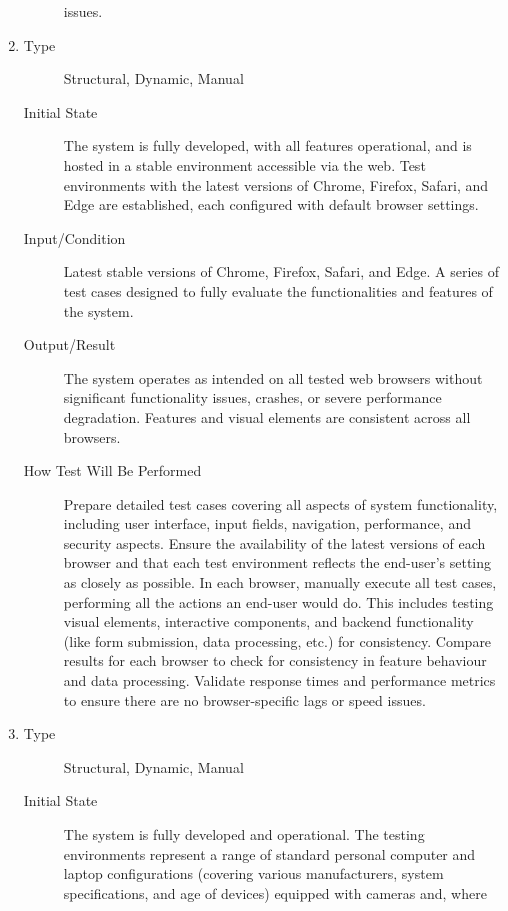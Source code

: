 \documentclass[12pt, titlepage]{article}
\begin{document}
\begin{enumerate}[NFR-T1]
\begin{description}
    issues.
  \end{description}
\item \label{NFRT17}
  \begin{description}
  \item[Type] Structural, Dynamic, Manual
  \item[Initial State] The system is fully developed, with all features
    operational, and is hosted in a stable environment accessible via the web.
    Test environments with the latest versions of Chrome, Firefox, Safari, and
    Edge are established, each configured with default browser settings.
  \item[Input/Condition] Latest stable versions of Chrome, Firefox, Safari, and
    Edge. A series of test cases designed to fully evaluate the functionalities
    and features of the system.
  \item[Output/Result] The system operates as intended on all tested web
    browsers without significant functionality issues, crashes, or severe
    performance degradation. Features and visual elements are consistent across
    all browsers.
  \item[How Test Will Be Performed] Prepare detailed test cases covering all
    aspects of system functionality, including user interface, input fields,
    navigation, performance, and security aspects. Ensure the availability of
    the latest versions of each browser and that each test environment reflects
    the end-user's setting as closely as possible. In each browser, manually
    execute all test cases, performing all the actions an end-user would do.
    This includes testing visual elements, interactive components, and backend
    functionality (like form submission, data processing, etc.) for consistency.
    Compare results for each browser to check for consistency in feature
    behaviour and data processing. Validate response times and performance
    metrics to ensure there are no browser-specific lags or speed issues.
  \end{description}
\item \label{NFRT18}
  \begin{description}
  \item[Type] Structural, Dynamic, Manual
  \item[Initial State] The system is fully developed and operational. The
    testing environments represent a range of standard personal computer and
    laptop configurations (covering various manufacturers, system
    specifications, and age of devices) equipped with cameras and, where

\end{description}
\end{enumerate}
\end{document}
